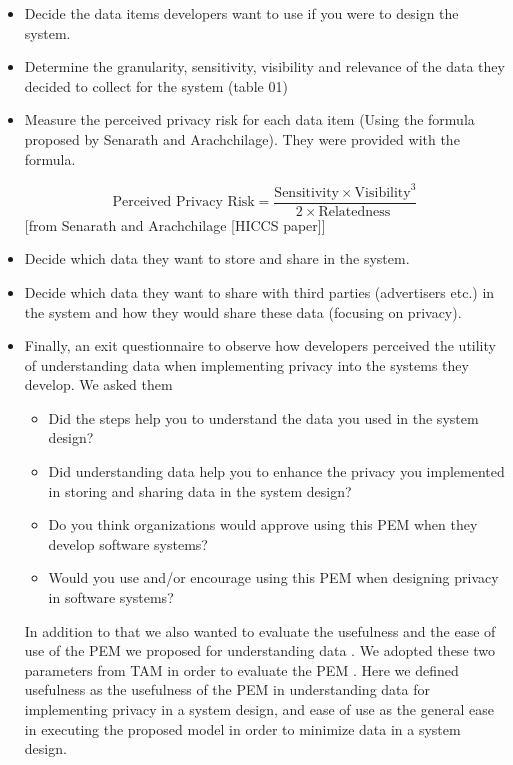 \documentclass{sigchi}
\begin{document}
\begin{itemize}
\item Decide the data items developers want to use if you were to design the system.
\item Determine the granularity, sensitivity, visibility and relevance of the data they decided to collect for the system (table 01)
\item Measure the perceived privacy risk for each data item (Using the formula proposed by Senarath and Arachchilage). They were provided with the formula.

\[ \text{Perceived Privacy Risk} = 
\frac{
     \text{Sensitivity} \times \text{Visibility} ^ 3 }
 {  2 \times \text{Relatedness }}
\] [from Senarath and Arachchilage [HICCS paper]]

\item Decide which data they want to store and share in the system.
\item Decide which data they want to share with third parties (advertisers etc.) in the system and how they would share these data (focusing on privacy).
\item Finally, an exit questionnaire to observe how developers perceived the utility of understanding data when implementing privacy into the systems they develop. We asked them 
\begin{itemize}
        \item Did the steps help you to understand the data you used in the system design?
        \item Did understanding data help you to enhance the privacy you implemented in storing and sharing data in the system design?
        \item Do you think organizations would approve using this PEM when they develop software systems?
        \item Would you use and/or encourage using this PEM when designing privacy in software systems?
\end{itemize}
In addition to that we also wanted to evaluate the usefulness and the ease of use of the PEM we proposed for understanding data \cite {venkatesh2000theoretical, legris2003people}. We adopted these two parameters from TAM in order to evaluate the PEM  \cite {venkatesh2000theoretical}. Here we defined usefulness as the usefulness of the PEM in understanding data for implementing privacy in a system design, and ease of use as the general ease in executing the proposed model in order to minimize data in a system design. 
\end{itemize}
\end{document}
